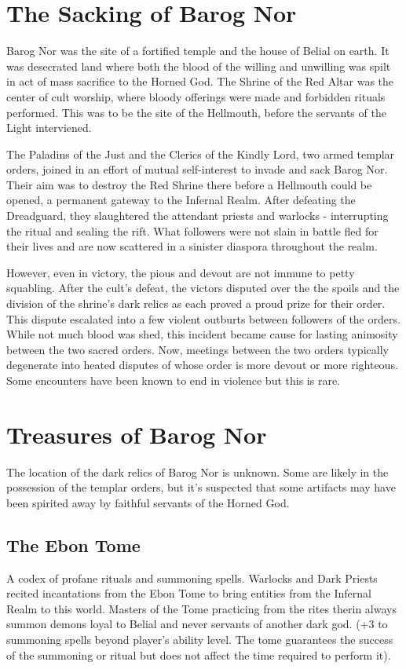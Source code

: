 \documentclass[12pt]{article}
\begin{document}
\section{The Sacking of Barog Nor}

Barog Nor was the site of a fortified temple and the house of Belial on earth.
It was desecrated land where both the blood of the willing and unwilling was
spilt in act of mass sacrifice to the Horned God. The Shrine of the Red Altar
was the center of cult worship, where bloody offerings were made and forbidden
rituals performed. This was to be the site of the Hellmouth, before the
servants of the Light interviened.

The Paladins of the Just and the Clerics of the Kindly Lord, two armed templar
orders, joined in an effort of mutual self-interest to invade and sack Barog
Nor. Their aim was to destroy the Red Shrine there before a Hellmouth could be
opened, a permanent gateway to the Infernal Realm. After defeating the
Dreadguard, they slaughtered the attendant priests and warlocks - interrupting
the ritual and sealing the rift. What followers were not slain in battle fled
for their lives and are now scattered in a sinister diaspora throughout the
realm.

However, even in victory, the pious and devout are not immune to petty
squabling. After the cult's defeat, the victors disputed over the the spoils
and the division of the shrine's dark relics as each proved a proud prize for
their order. This dispute escalated into a few violent outburts between
followers of the orders. While not much blood was shed, this incident became
cause for lasting animosity between the two sacred orders. Now, meetings
between the two orders typically degenerate into heated disputes of whose order
is more devout or more righteous. Some encounters have been known to end in
violence but this is rare.

\section{Treasures of Barog Nor}

The location of the dark relics of Barog Nor is unknown. Some are likely in the
possession of the templar orders, but it's suspected that some artifacts may
have been spirited away by faithful servants of the Horned God.

\subsection{The Ebon Tome}
A codex of profane rituals and summoning spells. Warlocks and
Dark Priests recited incantations from the Ebon Tome to bring entities from the
Infernal Realm to this world. Masters of the Tome practicing from the rites
therin always summon demons loyal to Belial and never servants of another dark
god. (+3 to summoning spells beyond player's ability level. The tome guarantees
the success of the summoning or ritual but does not affect the time required to
perform it).
\end{document}
